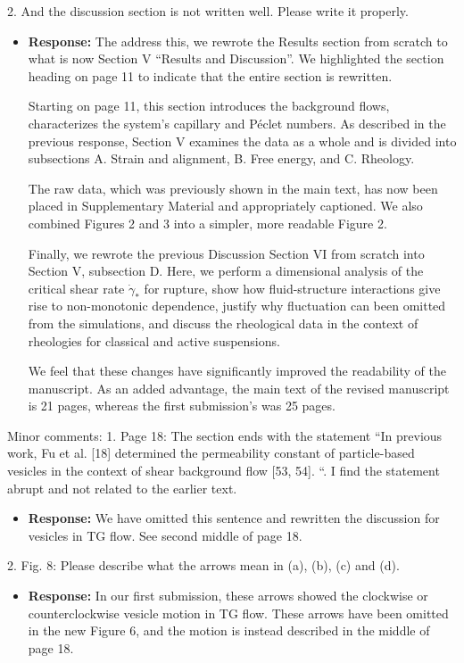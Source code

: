 \documentclass[11pt]{article}
\newcommand{\comment}[1]{{\color{blue} #1}}
\begin{document}
\noindent
\comment{2. And the discussion section is not written well. Please write it
properly.}
    \begin{itemize}
    \item[] {\bf Response:}
      The address this,
      we rewrote the Results section from scratch
    to what is now Section V ``Results and Discussion''.
    We highlighted the section heading on page 11 to indicate
    that the entire section is rewritten.

    Starting on page 11, this section introduces the background flows,
    characterizes the system's capillary and P\'eclet numbers.
    As described in the previous response, Section V examines the data
    as a whole and is divided into subsections A. Strain and alignment,
    B. Free energy, and C. Rheology.

    The raw data, which was previously shown in the
    main text, has now been placed in Supplementary Material
    and appropriately captioned.  We also combined
    Figures 2 and 3 into a simpler, more readable Figure 2.    

    Finally, we rewrote the previous Discussion Section VI from scratch
    into Section V, subsection D. Here,
    we perform a dimensional analysis of the critical shear rate $\dot \gamma_*$
    for rupture, show how fluid-structure interactions
    give rise to non-monotonic dependence, justify why
    fluctuation can been omitted from the simulations, and
    discuss the rheological data in the context of 
    rheologies for classical and active suspensions.

    We feel that these changes have significantly improved the readability
    of the manuscript.  As an added advantage, the main text of the
    revised manuscript is 21 pages, whereas the first submission's was
    25 pages.  
    \end{itemize}

\noindent
\comment{Minor comments: 1. Page 18: The section ends with 
the statement “In previous work, Fu
et al. [18] determined the permeability constant of particle-based
vesicles in the context of shear background flow [53, 54]. “. I find
the statement abrupt and not related to the earlier text.}

\begin{itemize}
  \item[] {\bf Response:}
    We have omitted this sentence and rewritten the discussion
    for vesicles in TG flow.  See second middle of page 18.   
\end{itemize}

\noindent
\comment{2. Fig. 8: Please describe what the arrows mean in (a), (b), (c) and
(d).}

\begin{itemize}
\item[] {\bf Response:}
  In our first submission, these arrows showed the clockwise or counterclockwise
  vesicle motion in TG flow.  These arrows have been omitted in the new Figure 6,
  and the motion is instead described in the middle of page 18. 
\end{itemize}
\end{document}
